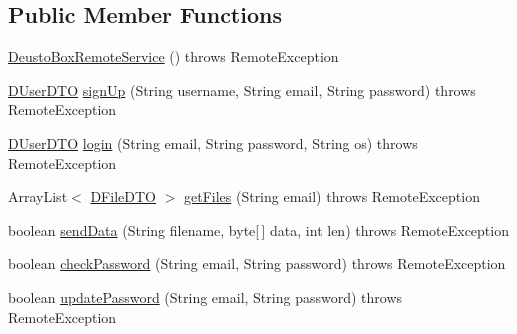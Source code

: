 \subsection*{Public Member Functions}
\begin{DoxyCompactItemize}
\item 
\mbox{\hyperlink{classes_1_1deusto_1_1bspq18_1_1e6_1_1_deusto_box_1_1_server_1_1remote_1_1_deusto_box_remote_service_aa4abee90c254a080806954bf0f790b0b}{Deusto\+Box\+Remote\+Service}} ()  throws Remote\+Exception 
\item 
\mbox{\hyperlink{classes_1_1deusto_1_1bspq18_1_1e6_1_1_deusto_box_1_1_server_1_1dto_1_1_d_user_d_t_o}{D\+User\+D\+TO}} \mbox{\hyperlink{classes_1_1deusto_1_1bspq18_1_1e6_1_1_deusto_box_1_1_server_1_1remote_1_1_deusto_box_remote_service_a68b337e7b4cb85957579b60863d7e0a0}{sign\+Up}} (String username, String email, String password)  throws Remote\+Exception 
\item 
\mbox{\hyperlink{classes_1_1deusto_1_1bspq18_1_1e6_1_1_deusto_box_1_1_server_1_1dto_1_1_d_user_d_t_o}{D\+User\+D\+TO}} \mbox{\hyperlink{classes_1_1deusto_1_1bspq18_1_1e6_1_1_deusto_box_1_1_server_1_1remote_1_1_deusto_box_remote_service_a231055c7ef7c8054f139b161fbe58626}{login}} (String email, String password, String os)  throws Remote\+Exception 
\item 
Array\+List$<$ \mbox{\hyperlink{classes_1_1deusto_1_1bspq18_1_1e6_1_1_deusto_box_1_1_server_1_1dto_1_1_d_file_d_t_o}{D\+File\+D\+TO}} $>$ \mbox{\hyperlink{classes_1_1deusto_1_1bspq18_1_1e6_1_1_deusto_box_1_1_server_1_1remote_1_1_deusto_box_remote_service_a08c60cb9bff7018bf484c7f721f71d0c}{get\+Files}} (String email)  throws Remote\+Exception 
\item 
boolean \mbox{\hyperlink{classes_1_1deusto_1_1bspq18_1_1e6_1_1_deusto_box_1_1_server_1_1remote_1_1_deusto_box_remote_service_aeeafed7d44048979f7d349f38300fc82}{send\+Data}} (String filename, byte\mbox{[}$\,$\mbox{]} data, int len)  throws Remote\+Exception 
\item 
boolean \mbox{\hyperlink{classes_1_1deusto_1_1bspq18_1_1e6_1_1_deusto_box_1_1_server_1_1remote_1_1_deusto_box_remote_service_a5554ad18e8eeaaba4cd51e598c5b6114}{check\+Password}} (String email, String password)  throws Remote\+Exception 
\item 
boolean \mbox{\hyperlink{classes_1_1deusto_1_1bspq18_1_1e6_1_1_deusto_box_1_1_server_1_1remote_1_1_deusto_box_remote_service_ae0e6d493d943f30b092a6041d0d3328e}{update\+Password}} (String email, String password)  throws Remote\+Exception 
\item 

\end{DoxyCompactItemize}
